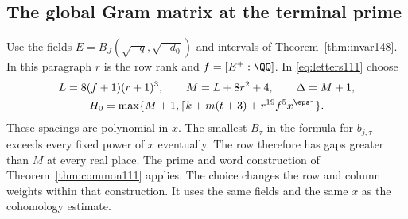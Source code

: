 \documentclass[a4paper,11pt]{article}
\theoremstyle{definition}
\theoremstyle{remark}
\numberwithin{equation}{section}
\begin{document}

\subsection{The global Gram matrix at the terminal prime}\label{nav:VII-29}
Use the fields \(E=B_J(\sqrt{-q},\sqrt{-d_0})\) and intervals of
Theorem~\ref{thm:invar148}. In this paragraph \(r\) is the row rank
and \(f=[E^+:\QQ]\). In \eqref{eq:letters111} choose
\begin{gather*}
 L=8(f+1)(r+1)^3,\qquad M=L+8r^2+4,\qquad \Delta=M+1,\\
 H_0=\max\{M+1,\lceil k+m(t+3)+r^{19}f^5x^\eps\rceil\}.
\end{gather*}
These spacings are polynomial in \(x\). The smallest \(B_\tau\)
in the formula for \(b_{j,\tau}\) exceeds every fixed power of
\(x\) eventually. The row therefore has gaps greater than \(M\)
at every real place. The prime and word construction of
Theorem~\ref{thm:common111} applies. The choice changes the row
and column weights within that construction. It uses the same
fields and the same \(x\) as the cohomology estimate.
\end{document}
